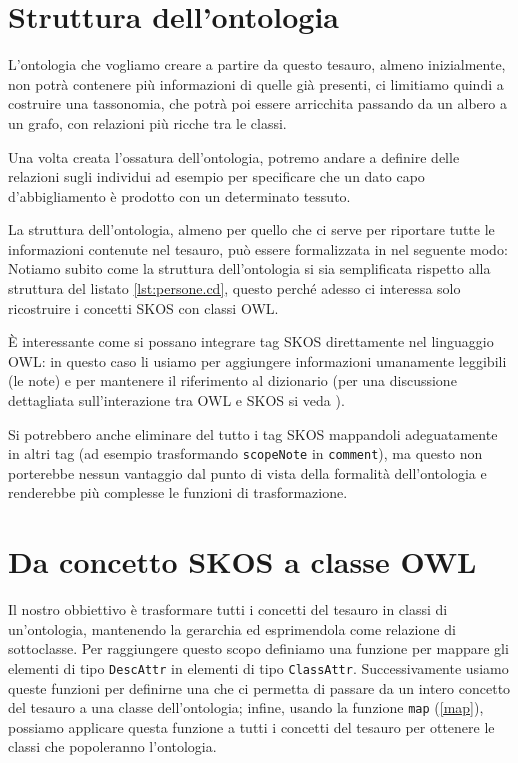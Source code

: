 \section{Struttura dell'ontologia}
L'ontologia che vogliamo creare a partire da questo tesauro, almeno inizialmente, non potrà contenere più informazioni di quelle già presenti, ci limitiamo quindi a costruire una tassonomia, che potrà poi essere arricchita passando da un albero a un grafo, con relazioni più ricche tra le classi. 

Una volta creata l'ossatura dell'ontologia, potremo andare a definire delle relazioni sugli individui ad esempio per specificare che un dato capo d'abbigliamento è prodotto con un determinato tessuto.

La struttura dell'ontologia, almeno per quello che ci serve per riportare tutte le informazioni contenute nel tesauro, può essere formalizzata in \cduce nel seguente modo:
Notiamo subito come la struttura dell'ontologia si sia semplificata rispetto alla struttura del listato \ref{lst:persone.cd}, questo perché adesso ci interessa solo ricostruire i concetti SKOS con classi OWL.

È interessante come si possano integrare tag SKOS direttamente nel linguaggio OWL: in questo caso li usiamo per aggiungere informazioni umanamente leggibili (le note) e per mantenere il riferimento al dizionario (per una discussione dettagliata sull'interazione tra OWL e SKOS si veda \cite{OWL&SKOS}).

Si potrebbero anche eliminare del tutto i tag SKOS mappandoli adeguatamente in altri tag (ad esempio trasformando \verb|scopeNote| in \verb|comment|), ma questo non porterebbe nessun vantaggio dal punto di vista della formalità dell'ontologia e renderebbe più complesse le funzioni di trasformazione.

\section{Da concetto SKOS a classe OWL}
Il nostro obbiettivo è trasformare tutti i concetti del tesauro in classi di un'ontologia, mantenendo la gerarchia ed esprimendola come relazione di sottoclasse. Per raggiungere questo scopo definiamo una funzione per mappare gli elementi di tipo \verb|DescAttr| in elementi di tipo \verb|ClassAttr|. Successivamente usiamo queste funzioni per definirne una che ci permetta di passare da un intero concetto del tesauro a una classe dell'ontologia; infine, usando la funzione \verb|map| (\ref{map}), possiamo applicare questa funzione a tutti i concetti del tesauro per ottenere le classi che popoleranno l'ontologia.
